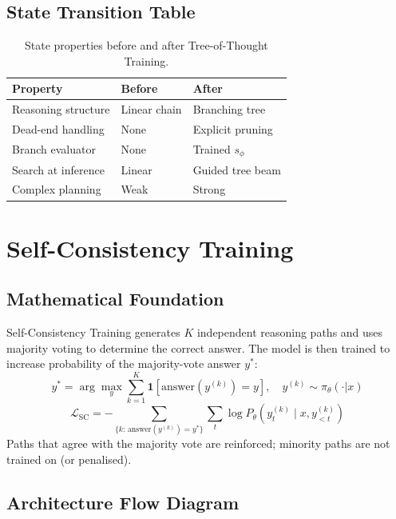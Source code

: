 \subsection{State Transition Table}
\begin{table}[h]\centering
\begin{tabular}{lll}\toprule
\textbf{Property} & \textbf{Before} & \textbf{After}\\\midrule
Reasoning structure & Linear chain & Branching tree\\
Dead-end handling & None & Explicit pruning\\
Branch evaluator & None & Trained $s_\phi$\\
Search at inference & Linear & Guided tree beam\\
Complex planning & Weak & Strong\\\bottomrule
\end{tabular}
\caption{State properties before and after Tree-of-Thought Training.}
\end{table}

\newpage
\section{Self-Consistency Training}

\subsection{Mathematical Foundation}
Self-Consistency Training generates $K$ independent reasoning paths and uses majority voting to determine the correct answer. The model is then trained to increase probability of the majority-vote answer $y^*$:
\begin{equation}
  y^* = \arg\max_{y} \sum_{k=1}^K \mathbf{1}[\text{answer}(y^{(k)}) = y],\quad y^{(k)} \sim \pi_\theta(\cdot|x)
\end{equation}
\begin{equation}
  \mathcal{L}_{\text{SC}} = -\sum_{\{k:\,\text{answer}(y^{(k)})=y^*\}} \sum_t \log P_\theta(y^{(k)}_t \mid x, y^{(k)}_{<t})
\end{equation}
Paths that agree with the majority vote are reinforced; minority paths are not trained on (or penalised).

\subsection{Architecture Flow Diagram}

